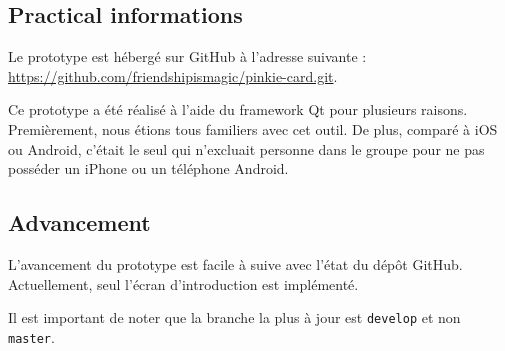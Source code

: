 \documentclass[a4paper,12pt]{article}
\begin{document}
\subsection{Practical informations}

Le prototype est hébergé sur GitHub à l'adresse suivante : \\
\url{https://github.com/friendshipismagic/pinkie-card.git}.

Ce prototype a été réalisé à l'aide du framework Qt pour plusieurs raisons. Premièrement, nous étions tous familiers
avec cet outil. De plus, comparé à iOS ou Android, c'était le seul qui n'excluait personne dans le groupe pour ne pas
posséder un iPhone ou un téléphone Android.

\subsection{Advancement}

L'avancement du prototype est facile à suive avec l'état du dépôt GitHub. Actuellement, seul l'écran d'introduction
est implémenté.

Il est important de noter que la branche la plus à jour est \texttt{develop} et non \texttt{master}.
\end{document}
